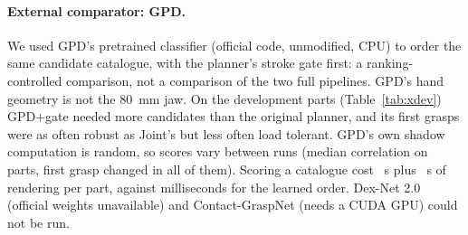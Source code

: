 \paragraph{External comparator: GPD.} We used GPD's pretrained classifier \cite{tenpas2017gpd} (official code, unmodified, CPU) to order the same candidate catalogue, with the planner's stroke gate first: a ranking-controlled comparison, not a comparison of the two full pipelines. GPD's hand geometry is not the 80~mm jaw. On the development parts (Table~\ref{tab:xdev}) GPD+gate needed more candidates than the original planner, and its first grasps were as often robust as Joint's but less often load tolerant. GPD's own shadow computation is random, so scores vary between runs (median correlation \gpdVarCorr{} on \gpdVarObjects{} parts, first grasp changed in all of them). Scoring a catalogue cost \gpdSeconds~s plus \gpdRenderSeconds~s of rendering per part, against milliseconds for the learned order. Dex-Net 2.0 (official weights unavailable) and Contact-GraspNet (needs a CUDA GPU) could not be run.
